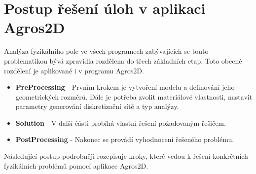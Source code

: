 
\chapter{Postup řešení úloh v aplikaci Agros2D}  \label{kap:tutorial}
Analýza fyzikálního pole ve všech programech zabývajících se touto problematikou bývá zpravidla rozdělena do třech základních etap. Toto obecné rozdělení je aplikované i v programu Agros2D.
\begin{itemize}
\item {\bf PreProcessing} - Prvním krokem je vytvoření modelu a definování jeho geometrických rozměrů. Dále je potřeba zvolit materiálové vlastnosti, nastavit parametry generování diskretizační sítě a typ analýzy.
\item {\bf Solution} - V další části probíhá vlastní řešení požadovaným řešičem.
\item {\bf PostProcessing} - Nakonec se provádí vyhodnocení řešeného problému.
\end{itemize}
Následující postup podrobněji rozepisuje kroky, které vedou k řešení konkrétních fyzikálních problémů pomocí aplikace Agros2D.
